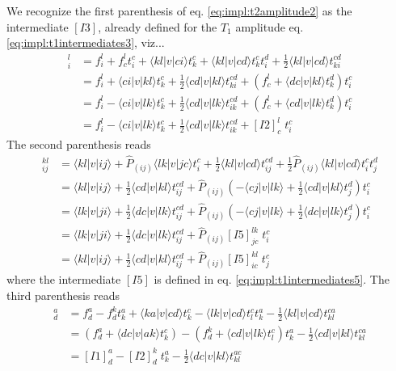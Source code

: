 We recognize the first parenthesis of eq. \ref{eq:impl:t2amplitude2} as the intermediate $[I3]$, already defined for the $\hat{T}_1$ amplitude eq. \ref{eq:impl:t1intermediates3}, viz...
\begin{align}
[I3]_{i}^{l} &= f_i^l + f_c^lt_i^c + \langle kl|v|ci\rangle t_k^c + \langle kl|v|cd\rangle t_k^ct_i^d+\frac{1}{2}\langle kl|v|cd\rangle t_{ki}^{cd}\nonumber\\
&=f_i^l+\langle ci|v|kl\rangle t_k^c+\frac{1}{2}\langle cd|v|kl\rangle t_{ki}^{cd}+(f_c^l+\langle dc|v|kl\rangle t_k^d)t_i^c\nonumber\\
&=f_i^l-\langle ci|v|lk\rangle t_k^c+\frac{1}{2}\langle cd|v|lk\rangle t_{ik}^{cd}+(f_c^l+\langle cd|v|lk\rangle t_k^d)t_i^c\nonumber\\
&=f_i^l-\langle ci|v|lk\rangle t_k^c+\frac{1}{2}\langle cd|v|lk\rangle t_{ik}^{cd}+[I2]_c^l\phantom{.}t_i^c
\label{eq:impl:t2intermediates3}
\end{align}
The second parenthesis reads
\begin{align}
[I6]_{ij}^{kl} &= \langle kl|v|ij\rangle +\hat{P}_{(ij)}\langle lk|v|jc\rangle t_i^c+\frac{1}{2}\langle kl|v|cd\rangle t_{ij}^{cd}+\frac{1}{2}\hat{P}_{(ij)}\langle kl|v|cd\rangle t_i^ct_j^d\nonumber\\
&=\langle kl|v|ij\rangle+\frac{1}{2}\langle cd|v|kl\rangle t_{ij}^{cd}+\hat{P}_{(ij)}\left(-\langle cj|v|lk\rangle+\frac{1}{2}\langle cd|v|kl\rangle t_j^d \right)t_i^c\nonumber\\
&=\langle lk|v|ji\rangle+\frac{1}{2}\langle dc|v|lk\rangle t_{ij}^{cd}+\hat{P}_{(ij)}\left(-\langle cj|v|lk\rangle+\frac{1}{2}\langle dc|v|lk\rangle t_j^d \right)t_i^c\nonumber\\
&=\langle lk|v|ji\rangle+\frac{1}{2}\langle dc|v|lk\rangle t_{ij}^{cd}+\hat{P}_{(ij)}[I5]_{jc}^{lk}\phantom{.}t_i^c\nonumber\\
&=\langle kl|v|ij\rangle+\frac{1}{2}\langle cd|v|kl\rangle t_{ij}^{cd}+\hat{P}_{(ij)}[I5]_{ic}^{kl}\phantom{.}t_j^c
\label{eq:impl:t2intermediates6}
\end{align}
where the intermediate $[I5]$ is defined in eq. \ref{eq:impl:t1intermediates5}. The third parenthesis reads
\begin{align}
[I7]_{d}^{a} &= f_d^a-f_d^kt_k^a+\langle ka|v|cd\rangle t_k^c-\langle lk|v|cd\rangle t_l^ct_k^a-\frac{1}{2}\langle kl|v|cd\rangle t_{kl}^{ca}\nonumber\\
&=\left(f_d^a +\langle dc|v|ak\rangle t_k^c\right)-\left(f_d^k+\langle cd|v|lk\rangle t_l^c\right)t_k^a-\frac{1}{2}\langle cd|v|kl\rangle t_{kl}^{ca}\nonumber\\
&=[I1]_d^a-[I2]_d^k\phantom{.}t_k^a-\frac{1}{2}\langle dc|v|kl\rangle t_{kl}^{ac}
\label{eq:impl:t2intermediates7}
\end{align}
